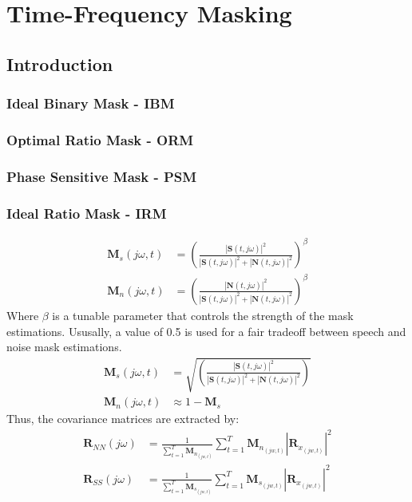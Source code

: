 \chapter{Time-Frequency Masking}
\section{Introduction}

\subsection{Ideal Binary Mask - IBM}


\subsection{Optimal Ratio Mask - ORM}
\subsection{Phase Sensitive Mask - PSM}

\subsection{Ideal Ratio Mask - IRM}

\begin{align}
    \mathbf{M}_{s}(j\omega, t) & = {\left( \frac{|\mathbf{S}(t,j\omega)|^2}{|\mathbf{S}(t,j\omega)|^2 + |\mathbf{N}(t,j\omega)|^2} \right)}^{\beta}                           \\
    \mathbf{M}_{n}(j\omega, t) & = {\left( \frac{|\mathbf{N}(t,j\omega)|^2}{|\mathbf{S}(t,j\omega)|^2 + |\mathbf{N}(t,j\omega)|^2} \right)}^{\beta}
\end{align}
%
Where \(\beta \) is a tunable parameter that controls the strength of the mask estimations. Ususally, a value of 0.5 is used 
for a fair tradeoff between speech and noise mask estimations.
%
\begin{align}
    \mathbf{M}_{s}(j\omega, t) & = \sqrt{\left( \frac{|\mathbf{S}(t,j\omega)|^2}{|\mathbf{S}(t,j\omega)|^2 + |\mathbf{N}(t,j\omega)|^2} \right)}                         \\
    \mathbf{M}_{n}(j\omega, t) & \approx 1 - \mathbf{M}_{s}
\end{align}
%
Thus, the covariance matrices are extracted by:
\begin{align}
    \mathbf{R}_{NN}(j\omega) & = \frac{1}{\sum\limits_{t=1}^{T}\mathbf{M}_{n_{(jw, t)}}}\sum_{t=1}^{T}\mathbf{M}_{n_{(jw, t)}}|\mathbf{R}_{x_{(jw, t)}}|^2\\
    \mathbf{R}_{SS}(j\omega) & = \frac{1}{\sum\limits_{t=1}^{T}\mathbf{M}_{s_{(jw, t)}}}\sum_{t=1}^{T}\mathbf{M}_{s_{(jw, t)}}|\mathbf{R}_{x_{(jw, t)}}|^2
\end{align}

